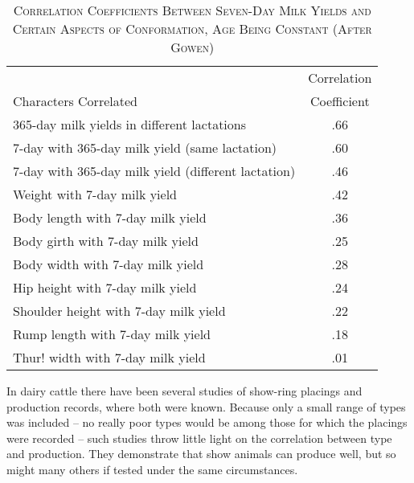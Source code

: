 \begin{table}[htbp]
	\centering
	\caption{\textsc{Correlation Coefficients Between Seven-Day Milk Yields and Certain Aspects
of Conformation, Age Being Constant (After Gowen)}}
	\label{tbl:Lush_Table_14}
	\begin{tabular}{lc}
		\hline
		\hline
		 													& Correlation \\
		Characters Correlated								& Coefficient \\
		\hline
		365-day milk yields in different lactations			& .66 \\
		7-day with 365-day milk yield (same lactation)		& .60 \\
		7-day with 365-day milk yield (different lactation)	& .46 \\
		Weight with 7-day milk yield						& .42 \\
		Body length with 7-day milk yield					& .36 \\
		Body girth with 7-day milk yield					& .25 \\
		Body width with 7-day milk yield					& .28 \\
		Hip height with 7-day milk yield					& .24 \\
		Shoulder height with 7-day milk yield				& .22 \\
		Rump length with 7-day milk yield					& .18 \\
		Thur! width with 7-day milk yield					& .01 \\
		\hline
	\end{tabular}
\end{table}

In dairy cattle there have been several studies of show-ring placings
and production records, where both were known. Because only a small
range of types was included -- no really poor types would be among
those for which the placings were recorded -- such studies throw little
light on the correlation between type and production. They demonstrate
that show animals can produce well, but so might many others if
tested under the same circumstances.

